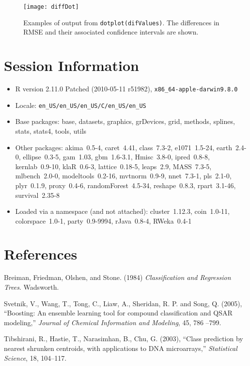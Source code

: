 \documentclass[12pt]{article}
\begin{document}
\begin{figure}
   \begin{center}		
      \texttt{[image: diffDot]}    

      \caption{ Examples of output from
        \texttt{dotplot(difValues)}. The differences in RMSE and their
        associated confidence intervals are shown.}
      \label{F:diffDot} 
    \end{center}
\end{figure} 


\section{Session Information}

\begin{itemize}\raggedright
  \item R version 2.11.0 Patched (2010-05-11 r51982), \verb|x86_64-apple-darwin9.8.0|
  \item Locale: \verb|en_US/en_US/en_US/C/en_US/en_US|
  \item Base packages: base, datasets, graphics, grDevices, grid,
    methods, splines, stats, stats4, tools, utils
  \item Other packages: akima~0.5-4, caret~4.41, class~7.3-2,
    e1071~1.5-24, earth~2.4-0, ellipse~0.3-5, gam~1.03, gbm~1.6-3.1,
    Hmisc~3.8-0, ipred~0.8-8, kernlab~0.9-10, klaR~0.6-3,
    lattice~0.18-5, leaps~2.9, MASS~7.3-5, mlbench~2.0-0,
    modeltools~0.2-16, mvtnorm~0.9-9, nnet~7.3-1, pls~2.1-0,
    plyr~0.1.9, proxy~0.4-6, randomForest~4.5-34, reshape~0.8.3,
    rpart~3.1-46, survival~2.35-8
  \item Loaded via a namespace (and not attached): cluster~1.12.3,
    coin~1.0-11, colorspace~1.0-1, party~0.9-9994, rJava~0.8-4,
    RWeka~0.4-1
\end{itemize}

\section{References}

\begin{description}

   
   \item Breiman, Friedman, Olshen, and Stone. (1984) {\it Classification and Regression Trees}. Wadsworth.


   \item Svetnik, V., Wang, T., Tong, C., Liaw, A., Sheridan, R. P. and Song, Q. (2005), ``Boosting: An ensemble learning tool for compound classification and QSAR modeling,'' {\it Journal of Chemical Information and Modeling}, 45, 786 --799.
   
   \item Tibshirani, R., Hastie, T., Narasimhan, B., Chu, G. (2003), ``Class prediction by nearest shrunken centroids, with applications to DNA microarrays,'' {\it  Statistical Science}, 18, 104--117.


\end{description}
\end{document}
